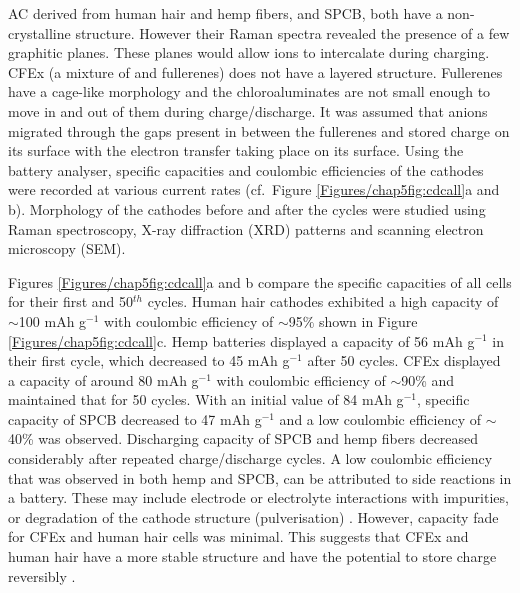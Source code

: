 AC derived from human hair and hemp fibers, and SPCB, both have a non-crystalline structure. However their Raman spectra revealed the presence of a few graphitic planes. These planes would allow  ions to intercalate during charging. CFEx (a mixture of  and  fullerenes) does not have a layered structure. Fullerenes have a cage-like morphology and the chloroaluminates are not small enough to move in and out of them during charge/discharge. It was assumed that  anions migrated through the gaps present in between the fullerenes and stored charge on its surface with the electron transfer taking place on its surface. Using the battery analyser, specific capacities and coulombic efficiencies of the cathodes were recorded at various current rates (cf.\ Figure \ref{Figures/chap5fig:cdcall}a and b). Morphology of the cathodes before and after the cycles were studied using Raman spectroscopy, X-ray diffraction (XRD) patterns and scanning electron microscopy (SEM).

Figures \ref{Figures/chap5fig:cdcall}a and b compare the specific capacities of all cells for their first and 50$^{th}$ cycles. Human hair cathodes exhibited a high capacity of $\sim$100 mAh g$^{-1}$ with coulombic efficiency of $\sim$95$\%$ shown in Figure \ref{Figures/chap5fig:cdcall}c. Hemp batteries displayed a capacity of 56 mAh g$^{-1}$ in their first cycle, which decreased to 45 mAh g$^{-1}$ after 50 cycles. CFEx displayed a capacity of around 80 mAh g$^{-1}$ with coulombic efficiency of $\sim$90\% and maintained that for 50 cycles. With an initial value of 84 mAh g$^{-1}$, specific capacity of SPCB decreased to 47 mAh g$^{-1}$ and a low coulombic efficiency of $\sim$40\% was observed. Discharging capacity of SPCB and hemp fibers decreased considerably after repeated charge/discharge cycles. A low coulombic efficiency that was observed in both hemp and SPCB, can be attributed to side reactions in a battery. These may include electrode or electrolyte interactions with impurities, or degradation of the cathode structure (pulverisation) \cite{gyenes_understanding_2015}. However, capacity fade for CFEx and human hair cells was minimal. This suggests that CFEx and human hair have a more stable structure and have the potential to store charge reversibly \cite{pramanick_human_2016}.\\



